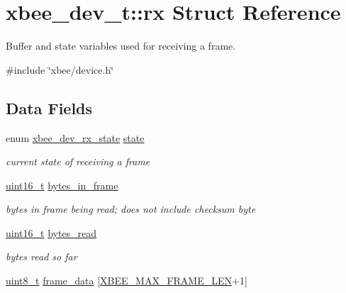 \hypertarget{structxbee__dev__t_1_1rx}{\section{xbee\-\_\-dev\-\_\-t\-:\-:rx Struct Reference}
\label{structxbee__dev__t_1_1rx}
}


Buffer and state variables used for receiving a frame.  




{\ttfamily \#include \char`\"{}xbee/device.\-h\char`\"{}}

\subsection*{Data Fields}
\begin{DoxyCompactItemize}
\item 
\hypertarget{group__xbee__device_ga758a79cfaf819f091728c06474466321}{enum \hyperlink{group__xbee__device_ga30374ada0aff261c5da7557882fd09de}{xbee\-\_\-dev\-\_\-rx\-\_\-state} \hyperlink{group__xbee__device_ga758a79cfaf819f091728c06474466321}{state}}\label{group__xbee__device_ga758a79cfaf819f091728c06474466321}

\begin{DoxyCompactList}\small\item\em current state of receiving a frame \end{DoxyCompactList}\item 
\hypertarget{group__xbee__device_ga1048ca0eb1adc5759a0df48ae8ae740a}{\hyperlink{group__hal_ga5a8b2dc9e45a9ee81a94ef304fb62505}{uint16\-\_\-t} \hyperlink{group__xbee__device_ga1048ca0eb1adc5759a0df48ae8ae740a}{bytes\-\_\-in\-\_\-frame}}\label{group__xbee__device_ga1048ca0eb1adc5759a0df48ae8ae740a}

\begin{DoxyCompactList}\small\item\em bytes in frame being read; does not include checksum byte \end{DoxyCompactList}\item 
\hypertarget{group__xbee__device_gad7b2ae5814cb8706ab662a5d67e4837a}{\hyperlink{group__hal_ga5a8b2dc9e45a9ee81a94ef304fb62505}{uint16\-\_\-t} \hyperlink{group__xbee__device_gad7b2ae5814cb8706ab662a5d67e4837a}{bytes\-\_\-read}}\label{group__xbee__device_gad7b2ae5814cb8706ab662a5d67e4837a}

\begin{DoxyCompactList}\small\item\em bytes read so far \end{DoxyCompactList}\item 
\hypertarget{group__xbee__device_gaa172073584adf9e2f74034489f9cd2a4}{\hyperlink{group__hal_gae1affc9ca37cfb624959c866a73f83c2}{uint8\-\_\-t} \hyperlink{group__xbee__device_gaa172073584adf9e2f74034489f9cd2a4}{frame\-\_\-data} \mbox{[}\hyperlink{group__xbee__device_gad842f3c5f8d2264a99ab67a01054323a}{X\-B\-E\-E\-\_\-\-M\-A\-X\-\_\-\-F\-R\-A\-M\-E\-\_\-\-L\-E\-N}+1\mbox{]}}\label{group__xbee__device_gaa172073584adf9e2f74034489f9cd2a4}


\end{DoxyCompactItemize}
